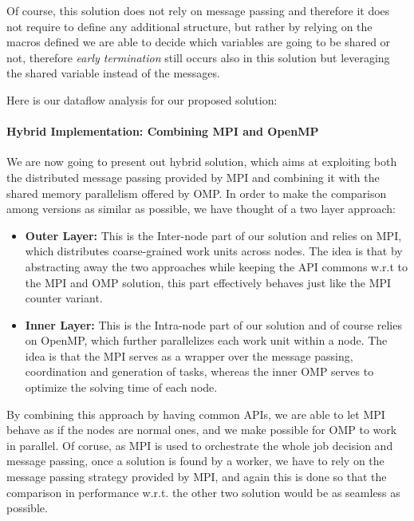 Of course, this solution does not rely on message passing and therefore it does not require to define any additional structure, but rather by relying on the macros defined we are able to decide which variables are going to be shared or not, therefore \textit{early termination} still occurs also in this solution but leveraging the shared variable instead of the messages. 

Here is our dataflow analysis for our proposed solution:

\paragraph{Hybrid Implementation: Combining MPI and OpenMP}
\label{par:hybrid_implementation}

We are now going to present out hybrid solution, which aims at exploiting both the distributed message passing provided by MPI and combining it with the shared memory parallelism offered by OMP. In order to make the comparison among versions as similar as possible, we have thought of a two layer approach:
\begin{itemize}
    \item \textbf{Outer Layer:} This is the Inter-node part of our solution and relies on MPI, which distributes coarse-grained work units across nodes. The idea is that by abstracting away the two approaches while keeping the API commons w.r.t to the MPI and OMP solution, this part effectively behaves just like the MPI counter variant.
    \item \textbf{Inner Layer:} This is the Intra-node part of our solution and of course relies on OpenMP, which further parallelizes each work unit within a node. The idea is that the MPI serves as a wrapper over the message passing, coordination and generation of tasks, whereas the inner OMP serves to optimize the solving time of each node.
\end{itemize}


By combining this approach by having common APIs, we are able to let MPI behave as if the nodes are normal ones, and we make possible for OMP to work in parallel. Of coruse, as MPI is used to orchestrate the whole job decision and message passing, once a solution is found by a worker, we have to rely on the message passing strategy provided by MPI, and again this is done so that the comparison in performance w.r.t. the other two solution would be as seamless as possible.

